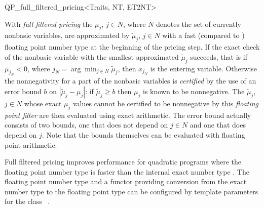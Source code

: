 
\begin{ccRefClass}{QP_full_filtered_pricing<Traits, NT, ET2NT>}

\ccDefinition

With \emph{full filtered pricing} the $\mu_{j}$, $j \in N$, where $N$ denotes
the set of currently nonbasic variables, are approximated by
$\tilde{\mu}_{j}$, $j \in N$ with a fast (compared to )
floating point number type  at the beginning of the pricing step.
If the exact check of the nonbasic variable with the smallest
approximated $\tilde{\mu}_{j}$ succeeds, that is if $\mu_{j_{N}} < 0$, where 
$j_{N} =\arg\min_{j \in N}\tilde{\mu}_{j}$, then $x_{j_{N}}$ is the
entering variable. Otherwise the nonnegativity for a part of the
nonbasic variables is \emph{certified} by the use of an error bound $b$ on
$\left|\tilde{\mu}_{j} - \mu_{j}\right|$:
if $\tilde{\mu}_{j} \geq b$ then $\mu_{j}$ is known to
be nonnegative. The $\tilde{\mu}_{j}$, $j \in N$ whose exact $\mu_{j}$ values  
cannot be certified to be nonnegative by this \emph{floating point filter}
are then evaluated
using exact arithmetic. The error bound actually consists of two bounds, one
that does not depend on $j \in N$ and one that does depend on $j$. Note that
the bounds themselves can be evaluated with floating point arithmetic. 

Full filtered pricing improves performance for quadratic programs
where the floating point
number type  is faster than the internal exact number type .
The floating point number type  and a functor providing conversion from
the exact number type  to the floating point type  can be
configured by template parameters for the class \ccRefName\ .


\end{ccRefClass}
